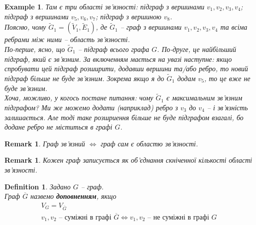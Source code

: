 \documentclass[a4paper, 14pt]{extarticle}
\theoremstyle{theoremdd}
\theoremstyle{theoremdd}
\newtheorem{definition}[theorem]{Definition}
\theoremstyle{theoremdd}
\theoremstyle{theoremdd}
\theoremstyle{theoremdd}
\newtheorem{example}[theorem]{Example}
\theoremstyle{theoremdd}
\theoremstyle{theoremdd}
\theoremstyle{theoremdd}
\theoremstyle{theoremdd}
\theoremstyle{theoremdd}
\theoremstyle{theoremdd}
\newtheorem{remark}[theorem]{Remark}
\theoremstyle{theoremdd}
\theoremstyle{theoremdd}
\theoremstyle{theoremdd}
\theoremstyle{theoremdd}
\begin{document}
\begin{example}
Там є три області зв'язності: підграф з вершинами $v_1,v_2,v_3,v_4$; підграф з вершинами $v_5,v_6,v_7$; підграф з вершиною $v_8$.\\
Поясню, чому $\tilde{G}_1 = (\tilde{V}_1,\tilde{E}_1)$, де $\tilde{G}_1$ -- граф з вершинами $v_1,v_2,v_3,v_4$ та всіма ребрами між ними -- область зв'язності.\\
По-перше, ясно, що $\tilde{G}_1$ -- підграф всього графа $G$. По-друге, це найбільший підграф, який є зв'язним. За включенням мається на увазі наступне: якщо спробувати цей підграф розширити, додавши вершини та/або ребро, то новий підграф більше не буде зв'язним. Зокрема якщо я до $\tilde{G}_1$ додам $v_5$, то це вже не буде зв'язним.\\
Хоча, можливо, у когось постане питання: чому $\tilde{G}_1$ є максимальним зв'язним підграфом? Ми же можемо додати (наприклад) ребро з $v_3$ до $v_4$ -- і зв'язність залишається. Але тоді таке розшриення більше не буде підграфом взагалі, бо додане ребро не міститься в графі $G$.
\end{example}

\begin{remark}
Граф зв'язний $\iff$ граф сам є областю зв'язності.
\end{remark}

\begin{remark}
Кожен граф записується як об'єднання скніченної кількості області зв'язності.
\end{remark}

\begin{definition}
Задано $G$ -- граф.\\
Граф $\overline{G}$ назвемо \textbf{доповненням}, якщо
\begin{align*}
V_G = V_{\overline{G}} \\
v_1,v_2 \text{ -- суміжні в графі } \overline{G} \iff v_1,v_2 \text{ -- не суміжні в графі } G
\end{align*}
\end{definition}
\end{document}
